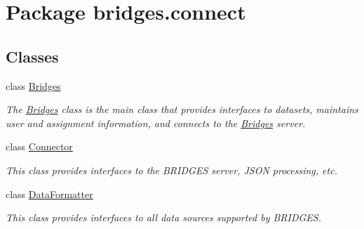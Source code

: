 \hypertarget{namespacebridges_1_1connect}{}\section{Package bridges.\+connect}
\label{namespacebridges_1_1connect}
\subsection*{Classes}
\begin{DoxyCompactItemize}
\item 
class \mbox{\hyperlink{classbridges_1_1connect_1_1_bridges}{Bridges}}
\begin{DoxyCompactList}\small\item\em The \mbox{\hyperlink{classbridges_1_1connect_1_1_bridges}{Bridges}} class is the main class that provides interfaces to datasets, maintains user and assignment information, and connects to the \mbox{\hyperlink{classbridges_1_1connect_1_1_bridges}{Bridges}} server. \end{DoxyCompactList}\item 
class \mbox{\hyperlink{classbridges_1_1connect_1_1_connector}{Connector}}
\begin{DoxyCompactList}\small\item\em This class provides interfaces to the B\+R\+I\+D\+G\+ES server, J\+S\+ON processing, etc. \end{DoxyCompactList}\item 
class \mbox{\hyperlink{classbridges_1_1connect_1_1_data_formatter}{Data\+Formatter}}
\begin{DoxyCompactList}\small\item\em This class provides interfaces to all data sources supported by B\+R\+I\+D\+G\+ES. \end{DoxyCompactList}\end{DoxyCompactItemize}

